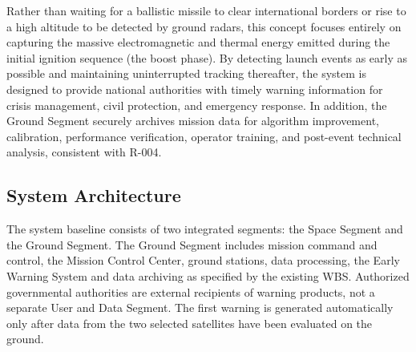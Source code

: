 Rather than waiting for a ballistic missile to clear international borders or rise to a high altitude to be detected by ground radars, this concept focuses entirely on capturing the massive electromagnetic and thermal energy emitted during the initial ignition sequence (the boost phase). By detecting launch events as early as possible and maintaining uninterrupted tracking thereafter, the system is designed to provide national authorities with timely warning information for crisis management, civil protection, and emergency response. In addition, the Ground Segment securely archives mission data for algorithm improvement, calibration, performance verification, operator training, and post-event technical analysis, consistent with R-004. 

\subsection{System Architecture}
\label{sec:ground-segment-boundary} 
The system baseline consists of two integrated segments: the Space Segment and the Ground Segment. The Ground Segment includes mission command and control, the Mission Control Center, ground stations, data processing, the Early Warning System and data archiving as specified by the existing WBS. Authorized governmental authorities are external recipients of warning products, not a separate User and Data Segment. The first warning is generated automatically only after data from the two selected  satellites have been evaluated on the ground. 


